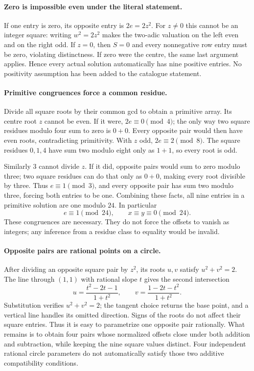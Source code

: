\documentclass[11pt,a4paper]{article}
\begin{document}
\paragraph{Zero is impossible even under the literal statement.}
If one entry is zero, its opposite entry is $2e=2z^2$. For $z\ne0$
this cannot be an integer square: writing $w^2=2z^2$ makes the
two-adic valuation on the left even and on the right odd. If $z=0$,
then $S=0$ and every nonnegative row entry must be zero, violating
distinctness. If zero were the centre, the same last argument applies.
Hence every actual solution automatically has nine positive entries.
No positivity assumption has been added to the catalogue statement.

\paragraph{Primitive congruences force a common residue.}
Divide all square roots by their common gcd to obtain a primitive array.
Its centre root $z$ cannot be even. If it were, $2e\equiv0\pmod4$;
the only way two square residues modulo four sum to zero is $0+0$.
Every opposite pair would then have even roots, contradicting
primitivity. With $z$ odd, $2e\equiv2\pmod8$. The square residues
$0,1,4$ have sum two modulo eight only as $1+1$, so every root is odd.

Similarly $3$ cannot divide $z$. If it did, opposite pairs would sum
to zero modulo three; two square residues can do that only as $0+0$,
making every root divisible by three. Thus $e\equiv1\pmod3$, and
every opposite pair has sum two modulo three, forcing both entries to
be one. Combining these facts, all nine entries in a primitive solution
are one modulo $24$. In particular
\[
 e\equiv1\pmod{24},\qquad x\equiv y\equiv0\pmod{24}.
\]
These congruences are necessary. They do not force the offsets to vanish
as integers; any inference from a residue class to equality would be
invalid.

\paragraph{Opposite pairs are rational points on a circle.}
After dividing an opposite square pair by $z^2$, its roots $u,v$ satisfy
$u^2+v^2=2$. The line through $(1,1)$ with rational slope $t$ gives
the second intersection
\[
 u=\frac{t^2-2t-1}{1+t^2},\qquad
 v=\frac{1-2t-t^2}{1+t^2}.
\]
Substitution verifies $u^2+v^2=2$; the tangent choice returns the base
point, and a vertical line handles its omitted direction. Signs of
the roots do not affect their square entries. Thus it is easy to
parametrize one opposite pair rationally. What remains is to obtain
four pairs whose normalized offsets close under both addition and
subtraction, while keeping the nine square values distinct. Four
independent rational circle parameters do not automatically satisfy
those two additive compatibility conditions.
\end{document}
